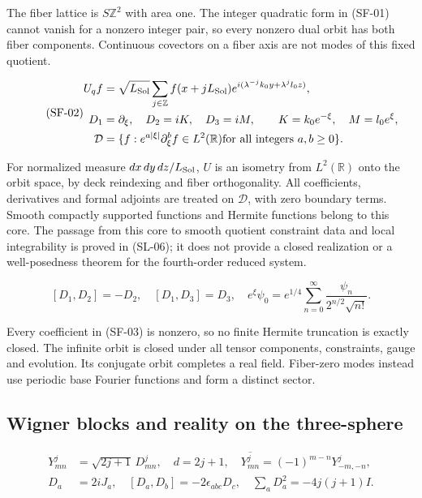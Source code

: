 The fiber lattice is $S\mathbb Z^2$ with area one. The integer quadratic form in (SF-01) cannot vanish for a nonzero integer pair, so every nonzero dual orbit has both fiber components. Continuous covectors on a fiber axis are not modes of this fixed quotient.

\begin{equation}\tag{SF-02}\label{eq:SF-02}
\begin{aligned}
U_qf&=\sqrt{L_{\rm Sol}}\sum_{j\in\mathbb Z}f(x+jL_{\rm Sol})
 e^{i(\lambda^{-j}k_0y+\lambda^jl_0z)},\\
D_1&=\partial_\xi,\quad D_2=iK,\quad D_3=iM,
\qquad K=k_0e^{-\xi},\quad M=l_0e^\xi,\\
\mathcal D&=\{f:e^{a|\xi|}\partial_\xi^bf\in L^2(\mathbb R) \text{for all integers }a,b\ge0\}.
\end{aligned}
\end{equation}

For normalized measure $dx\,dy\,dz/L_{\rm Sol}$, $U$ is an isometry from $L^2(\mathbb R)$ onto the orbit space, by deck reindexing and fiber orthogonality. All coefficients, derivatives and formal adjoints are treated on $\mathcal D$, with zero boundary terms. Smooth compactly supported functions and Hermite functions belong to this core. The passage from this core to smooth quotient constraint data and local integrability is proved in (SL-06); it does not provide a closed realization or a well-posedness theorem for the fourth-order reduced system.

\begin{equation}\tag{SF-03}\label{eq:SF-03}
[D_1,D_2]=-D_2,\quad[D_1,D_3]=D_3,\quad
e^\xi\psi_0= e^{1/4}\sum_{n=0}^{\infty}\frac{\psi_n}{2^{n/2}\sqrt{n!}}.
\end{equation}

Every coefficient in (SF-03) is nonzero, so no finite Hermite truncation is exactly closed. The infinite orbit is closed under all tensor components, constraints, gauge and evolution. Its conjugate orbit completes a real field. Fiber-zero modes instead use periodic base Fourier functions and form a distinct sector.

\subsection{Wigner blocks and reality on the three-sphere}

\begin{equation}\tag{TF-01}\label{eq:TF-01}
\begin{aligned}
Y^j_{mn}&=\sqrt{2j+1}\,D^j_{mn},\quad d=2j+1,\quad
\overline{Y^j_{mn}}=(-1)^{m-n}Y^j_{-m,-n},\\
D_a&=2iJ_a,\quad[D_a,D_b]=-2\epsilon_{abc}D_c,\quad
\sum_aD_a^2=-4j(j+1)I.
\end{aligned}
\end{equation}

